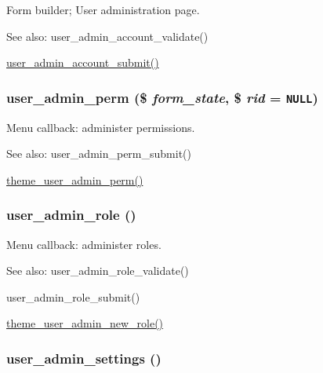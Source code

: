 Form builder; User administration page.

\begin{Desc}
\item[See also:]user\_\-admin\_\-account\_\-validate() 

\hyperlink{user_8admin_8inc_20540c356ad435d034ff0229323f33d5}{user\_\-admin\_\-account\_\-submit()} \end{Desc}
\hypertarget{group__forms_g6e5c6e76662734247a6c7ee90af67b26}{
\subsubsection[{user\_\-admin\_\-perm}]{\setlength{\rightskip}{0pt plus 5cm}user\_\-admin\_\-perm (\$ {\em form\_\-state}, \/  \$ {\em rid} = {\tt NULL})}}
\label{group__forms_g6e5c6e76662734247a6c7ee90af67b26}


Menu callback: administer permissions.

\begin{Desc}
\item[See also:]user\_\-admin\_\-perm\_\-submit() 

\hyperlink{group__themeable_gf699cde524801368ec966785c8dfc0ee}{theme\_\-user\_\-admin\_\-perm()} \end{Desc}
\hypertarget{group__forms_g90d892becb335c456346eecbbc3bb6de}{
\subsubsection[{user\_\-admin\_\-role}]{\setlength{\rightskip}{0pt plus 5cm}user\_\-admin\_\-role ()}}
\label{group__forms_g90d892becb335c456346eecbbc3bb6de}


Menu callback: administer roles.

\begin{Desc}
\item[See also:]user\_\-admin\_\-role\_\-validate() 

user\_\-admin\_\-role\_\-submit() 

\hyperlink{group__themeable_g5bd193ccf822945c67e66021b0f2df9d}{theme\_\-user\_\-admin\_\-new\_\-role()} \end{Desc}
\hypertarget{group__forms_g8cb1bc70278e0e628fd17c2ec8353bd1}{
\subsubsection[{user\_\-admin\_\-settings}]{\setlength{\rightskip}{0pt plus 5cm}user\_\-admin\_\-settings ()}}
\label{group__forms_g8cb1bc70278e0e628fd17c2ec8353bd1}


